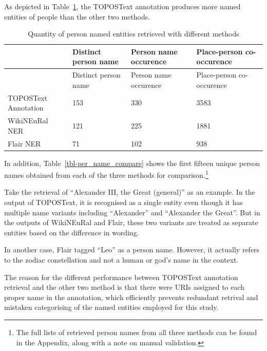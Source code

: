 \documentclass[
  12pt,
]{article}
\begin{document}
As depicted in Table~\ref{tbl-ner_compare}, the TOPOSText annotation
produces more named entities of people than the other two methods.

\hypertarget{tbl-ner_compare}{}
\begin{longtable}[]{@{}llll@{}}
\caption{\label{tbl-ner_compare}Quantity of person named entities
retrieved with different methods}\tabularnewline
\toprule\noalign{}
& Distinct person name & Person name occurence & Place-person
co-occurence \\
\midrule\noalign{}
\endfirsthead
\toprule\noalign{}
& Distinct person name & Person name occurence & Place-person
co-occurence \\
\midrule\noalign{}
\endhead
\bottomrule\noalign{}
\endlastfoot
TOPOSText Annotation & 153 & 330 & 3583 \\
WikiNEuRal NER & 121 & 225 & 1881 \\
Flair NER & 71 & 102 & 938 \\
\end{longtable}

In addition, Table~\ref{tbl-per_name_compare} shows the first fifteen
unique person names obtained from each of the three methods for
comparison.\footnote{The full lists of retrieved person names from all
  three methods can be found in the Appendix, along with a note on
  manual validation.}

Take the retrieval of ``Alexander III, the Great (general)'' as an
example. In the output of TOPOSText, it is recognised as a single entity
even though it has multiple name variants including ``Alexander'' and
``Alexander the Great''. But in the outputs of WikiNEuRal and Flair,
these two variants are treated as separate entities based on the
difference in wording.

In another case, Flair tagged ``Leo'' as a person name. However, it
actually refers to the zodiac constellation and not a human or god's
name in the context.

The reason for the different performance between TOPOSText annotation
retrieval and the other two method is that there were URIs assigned to
each proper name in the annotation, which efficiently prevents redundant
retrival and mistaken categorising of the named entities employed for
this study.
\end{document}

